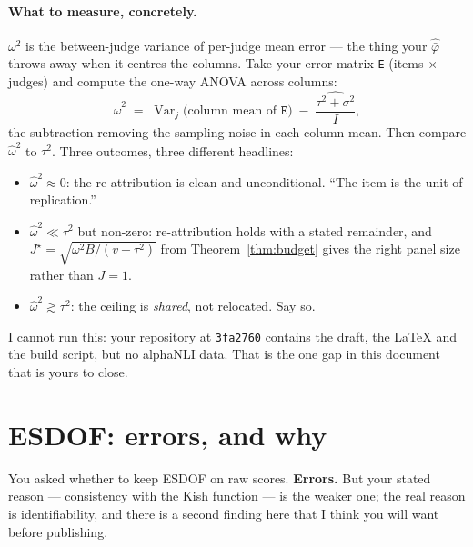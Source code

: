 \documentclass[11pt]{article}
\theoremstyle{plain}
\theoremstyle{definition}
\theoremstyle{remark}
\newcommand{\Var}{\operatorname{Var}}
\newcommand{\pb}{\bar{\varphi}}
\begin{document}
\paragraph{What to measure, concretely.} $\omega^2$ is the between-judge variance of per-judge
mean error --- the thing your $\hat{\pb}$ throws away when it centres the columns. Take your
error matrix \texttt{E} (items $\times$ judges) and compute the one-way ANOVA across columns:
\[
\hat{\omega}^2 \;=\; \Var_j\!\big(\text{column mean of } \texttt{E}\big) \;-\;
\frac{\widehat{\tau^2+\sigma^2}}{I},
\]
the subtraction removing the sampling noise in each column mean. Then compare $\hat\omega^2$ to
$\tau^2$. Three outcomes, three different headlines:
\begin{itemize}
\item $\hat\omega^2\approx0$: the re-attribution is clean and unconditional. ``The item is the
unit of replication.''
\item $\hat\omega^2\ll\tau^2$ but non-zero: re-attribution holds with a stated remainder, and
$J^\star=\sqrt{\omega^2B/(v+\tau^2)}$ from Theorem~\ref{thm:budget} gives the right panel size
rather than $J=1$.
\item $\hat\omega^2\gtrsim\tau^2$: the ceiling is \emph{shared}, not relocated. Say so.
\end{itemize}
I cannot run this: your repository at \texttt{3fa2760} contains the draft, the \LaTeX{} and the
build script, but no alphaNLI data. That is the one gap in this document that is yours to close.

\section{ESDOF: errors, and why}\label{sec:esdof}

You asked whether to keep ESDOF on raw scores. \textbf{Errors.} But your stated reason ---
consistency with the Kish function --- is the weaker one; the real reason is identifiability, and
there is a second finding here that I think you will want before publishing.
\end{document}
